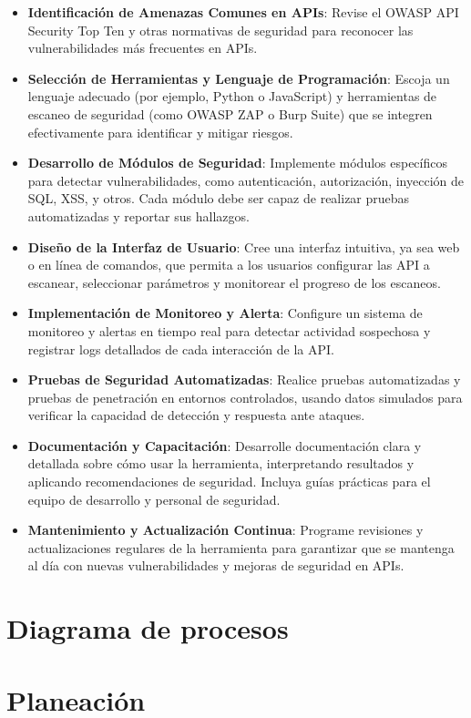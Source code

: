 \documentclass{article}
\begin{document}
    \begin{itemize}
        \item \textbf{Identificación de Amenazas Comunes en APIs}: Revise el OWASP API Security Top Ten y otras normativas de seguridad para reconocer las vulnerabilidades más frecuentes en APIs.
        \item \textbf{Selección de Herramientas y Lenguaje de Programación}: Escoja un lenguaje adecuado (por ejemplo, Python o JavaScript) y herramientas de escaneo de seguridad (como OWASP ZAP o Burp Suite) que se integren efectivamente para identificar y mitigar riesgos.
        \item \textbf{Desarrollo de Módulos de Seguridad}: Implemente módulos específicos para detectar vulnerabilidades, como autenticación, autorización, inyección de SQL, XSS, y otros. Cada módulo debe ser capaz de realizar pruebas automatizadas y reportar sus hallazgos.
        \item \textbf{Diseño de la Interfaz de Usuario}: Cree una interfaz intuitiva, ya sea web o en línea de comandos, que permita a los usuarios configurar las API a escanear, seleccionar parámetros y monitorear el progreso de los escaneos.
        \item \textbf{Implementación de Monitoreo y Alerta}: Configure un sistema de monitoreo y alertas en tiempo real para detectar actividad sospechosa y registrar logs detallados de cada interacción de la API.
        \item \textbf{Pruebas de Seguridad Automatizadas}: Realice pruebas automatizadas y pruebas de penetración en entornos controlados, usando datos simulados para verificar la capacidad de detección y respuesta ante ataques.
        \item \textbf{Documentación y Capacitación}: Desarrolle documentación clara y detallada sobre cómo usar la herramienta, interpretando resultados y aplicando recomendaciones de seguridad. Incluya guías prácticas para el equipo de desarrollo y personal de seguridad.
        \item \textbf{Mantenimiento y Actualización Continua}: Programe revisiones y actualizaciones regulares de la herramienta para garantizar que se mantenga al día con nuevas vulnerabilidades y mejoras de seguridad en APIs.        
    \end{itemize}
    \section{Diagrama de procesos}
    
    \section{Planeación}
    
\end{document}
